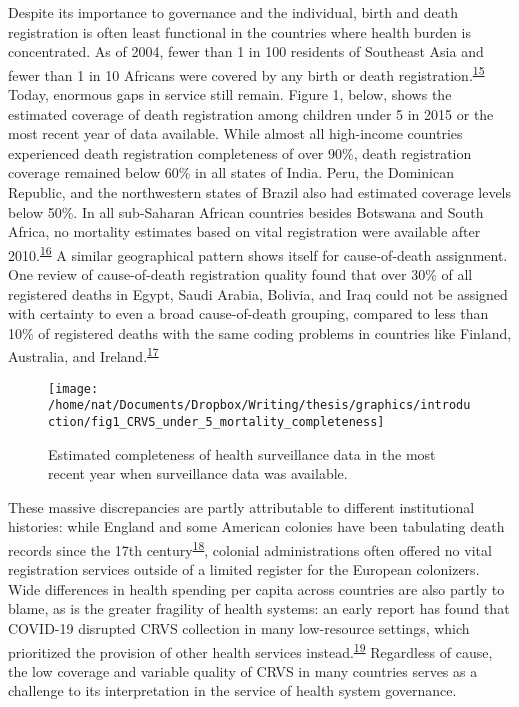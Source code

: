 \documentclass[
]{article}
\begin{document}
Despite its importance to governance and the individual, birth and death registration is often least functional in the countries where health burden is concentrated. As of 2004, fewer than 1 in 100 residents of Southeast Asia and fewer than 1 in 10 Africans were covered by any birth or death registration.\textsuperscript{\protect\hyperlink{ref-Mahapatra2007}{15}} Today, enormous gaps in service still remain. Figure 1, below, shows the estimated coverage of death registration among children under 5 in 2015 or the most recent year of data available. While almost all high-income countries experienced death registration completeness of over 90\%, death registration coverage remained below 60\% in all states of India. Peru, the Dominican Republic, and the northwestern states of Brazil also had estimated coverage levels below 50\%. In all sub-Saharan African countries besides Botswana and South Africa, no mortality estimates based on vital registration were available after 2010.\textsuperscript{\protect\hyperlink{ref-Roth2018}{16}} A similar geographical pattern shows itself for cause-of-death assignment. One review of cause-of-death registration quality found that over 30\% of all registered deaths in Egypt, Saudi Arabia, Bolivia, and Iraq could not be assigned with certainty to even a broad cause-of-death grouping, compared to less than 10\% of registered deaths with the same coding problems in countries like Finland, Australia, and Ireland.\textsuperscript{\protect\hyperlink{ref-Johnson2021}{17}}

\begin{figure}[!ht]

{\centering \texttt{[image: /home/nat/Documents/Dropbox/Writing/thesis/graphics/introduction/fig1\_CRVS\_under\_5\_mortality\_completeness]} 

}

\caption{Estimated completeness of health surveillance data in the most recent year when surveillance data was available.}\label{fig:fig1}
\end{figure}

These massive discrepancies are partly attributable to different institutional histories: while England and some American colonies have been tabulating death records since the 17th century\textsuperscript{\protect\hyperlink{ref-Blake1955}{18}}, colonial administrations often offered no vital registration services outside of a limited register for the European colonizers. Wide differences in health spending per capita across countries are also partly to blame, as is the greater fragility of health systems: an early report has found that COVID-19 disrupted CRVS collection in many low-resource settings, which prioritized the provision of other health services instead.\textsuperscript{\protect\hyperlink{ref-AbouZahr2021}{19}} Regardless of cause, the low coverage and variable quality of CRVS in many countries serves as a challenge to its interpretation in the service of health system governance.
\end{document}
